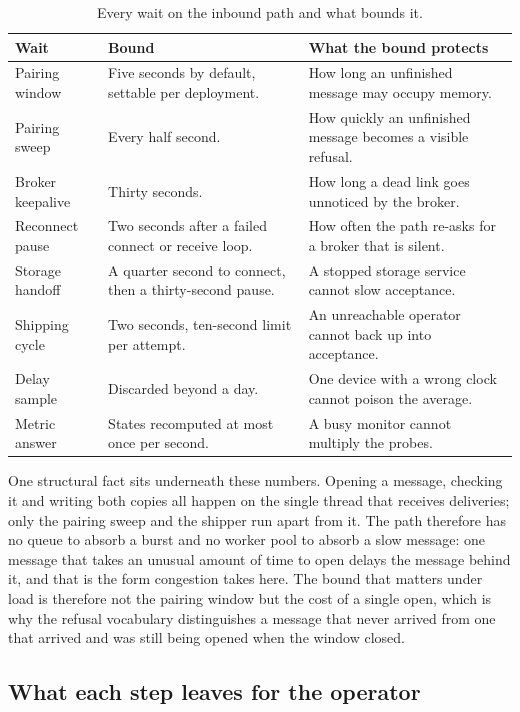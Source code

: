 \documentclass[12pt,a4paper]{report}
\begin{document}
\begin{table}[htbp]
\centering
{\small
\begin{tabularx}{\textwidth}{@{}p{3.2cm}p{4.2cm}Y@{}}
\toprule
\textbf{Wait} & \textbf{Bound} & \textbf{What the bound protects} \\
\midrule
Pairing window &
Five seconds by default, settable per deployment. &
How long an unfinished message may occupy memory. \\
Pairing sweep &
Every half second. &
How quickly an unfinished message becomes a visible refusal. \\
Broker keepalive &
Thirty seconds. &
How long a dead link goes unnoticed by the broker. \\
Reconnect pause &
Two seconds after a failed connect or receive loop. &
How often the path re-asks for a broker that is silent. \\
Storage handoff &
A quarter second to connect, then a thirty-second pause. &
A stopped storage service cannot slow acceptance. \\
Shipping cycle &
Two seconds, ten-second limit per attempt. &
An unreachable operator cannot back up into acceptance. \\
Delay sample &
Discarded beyond a day. &
One device with a wrong clock cannot poison the average. \\
Metric answer &
States recomputed at most once per second. &
A busy monitor cannot multiply the probes. \\
\bottomrule
\end{tabularx}}
\caption{Every wait on the inbound path and what bounds it.}
\label{tab:gw-in-waits}
\end{table}

One structural fact sits underneath these numbers. Opening a message,
checking it and writing both copies all happen on the single thread
that receives deliveries; only the pairing sweep and the shipper run
apart from it. The path therefore has no queue to absorb a burst and no
worker pool to absorb a slow message: one message that takes an unusual
amount of time to open delays the message behind it, and that is the
form congestion takes here. The bound that matters under load is
therefore not the pairing window but the cost of a single open, which
is why the refusal vocabulary distinguishes a message that never
arrived from one that arrived and was still being opened when the
window closed.

\subsection{What each step leaves for the operator}
\label{sec:gw-in-signals}
\end{document}
